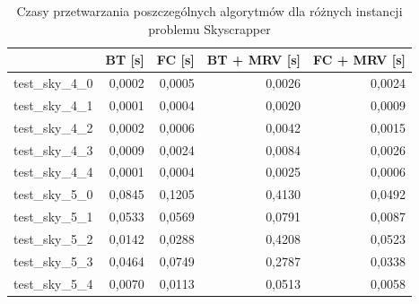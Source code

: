 \documentclass{article}
\begin{document}
	\begin{table}[H]
		\caption{Czasy przetwarzania poszczególnych algorytmów dla różnych instancji problemu Skyscrapper}
		\label{tab:skyscrapper_times}
		\begin{center}
			\begin{tabular}{|l|r|r|r|r|}
				\hline
				& \multicolumn{1}{c|}{\textbf{BT [s]}} & \multicolumn{1}{c|}{\textbf{FC [s]}} & \multicolumn{1}{l|}{\textbf{BT + MRV [s]}} & \multicolumn{1}{l|}{\textbf{FC + MRV [s]}} \\ \hline
				test\_sky\_4\_0 & 0,0002                           & 0,0005                           & 0,0026                                 & 0,0024                                 \\ \hline
				test\_sky\_4\_1 & 0,0001                           & 0,0004                           & 0,0020                                 & 0,0009                                 \\ \hline
				test\_sky\_4\_2 & 0,0002                           & 0,0006                           & 0,0042                                 & 0,0015                                 \\ \hline
				test\_sky\_4\_3 & 0,0009                           & 0,0024                           & 0,0084                                 & 0,0026                                 \\ \hline
				test\_sky\_4\_4 & 0,0001                           & 0,0004                           & 0,0025                                 & 0,0006                                 \\ \hline
				test\_sky\_5\_0 & 0,0845                           & 0,1205                           & 0,4130                                 & 0,0492                                 \\ \hline
				test\_sky\_5\_1 & 0,0533                           & 0,0569                           & 0,0791                                 & 0,0087                                 \\ \hline
				test\_sky\_5\_2 & 0,0142                           & 0,0288                           & 0,4208                                 & 0,0523                                 \\ \hline
				test\_sky\_5\_3 & 0,0464                           & 0,0749                           & 0,2787                                 & 0,0338                                 \\ \hline
				test\_sky\_5\_4 & 0,0070                           & 0,0113                           & 0,0513                                 & 0,0058                                 \\ \hline

\end{tabular}
\end{center}
\end{table}
\end{document}
